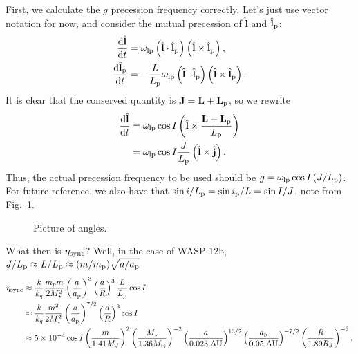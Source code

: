 \documentclass[11pt,
        usenames, %
        dvipsnames %
    ]{article}
\newcommand*{\scinot}[2]{#1\times10^{#2}}
\newcommand*{\rd}[2]{\frac{\mathrm{d}#1}{\mathrm{d}#2}}
\newcommand*{\bm}[1]{\boldsymbol{\mathbf{#1}}}
\newcommand*{\p}[1]{\left(#1\right)}
\newcommand*{\uv}[1]{\hat{\bm{#1}}}
\begin{document}
First, we calculate the $g$ precession frequency correctly. Let's just use
vector notation for now, and consider the mutual precession of $\uv{l}$ and
$\uv{l}_{\rm p}$:
\begin{align}
    \rd{\uv{l}}{t} &= \omega_{\rm lp}\p{\uv{l} \cdot \uv{l}_{\rm p}}
        \p{\uv{l} \times \uv{l}_{\rm p}},\\
    \rd{\uv{l}_{\rm p}}{t} &= -\frac{L}{L_{\rm p}}\omega_{\rm lp}\p{\uv{l} \cdot
        \uv{l}_{\rm p}} \p{\uv{l} \times \uv{l}_{\rm p}}.
\end{align}
It is clear that the conserved quantity is $\bm{J} = \bm{L} + \bm{L}_{\rm p}$,
so we rewrite
\begin{align}
    \rd{\uv{l}}{t} &= \omega_{\rm lp} \cos I\p{\uv{l} \times
            \frac{\bm{L} + \bm{L}_{\rm p}}{L_{\rm p}}}\nonumber\\
        &= \omega_{\rm lp} \cos I
            \frac{J}{L_{\rm p}}\p{\uv{l} \times \uv{j}}.
\end{align}
Thus, the actual precession frequency to be used should be $g = \omega_{\rm lp}
\cos I \p{J / L_{\rm p}}$. For future reference, we also have that $\sin i /
L_{\rm p} = \sin i_{\rm p} / L = \sin I / J$, note from Fig.~\ref{fig:angles}.
\begin{figure}
    \centering
    \caption{Picture of angles.}\label{fig:angles}
\end{figure}

What then is $\eta_{\rm sync}$? Well, in the case of WASP-12b, $J / L_{\rm p}
\approx L / L_{\rm p} \approx (m/m_{\rm p})\sqrt{a / a_{\rm p}}$
\begin{align}
    \eta_{\rm sync} &\approx
            \frac{k}{k_q}\frac{m_pm}{2M_\star^2}\p{\frac{a}{a_{\rm p}}}^3
            \p{\frac{a}{R}}^3\frac{L}{L_{\rm p}}\cos I\nonumber\\
        &\approx
            \frac{k}{k_q}\frac{m^2}{2M_\star^2}\p{\frac{a}{a_{\rm p}}}^{7/2}
            \p{\frac{a}{R}}^3\cos I\nonumber\\
        &\approx
            \scinot{5}{-4} \cos I\p{\frac{m}{1.41M_J}}^2
                \p{\frac{M_\star}{1.36M_{\odot}}}^{-2}
                \p{\frac{a}{0.023\;\mathrm{AU}}}^{13/2}
                \p{\frac{a_{\rm p}}{0.05\;\mathrm{AU}}}^{-7/2}
                \p{\frac{R}{1.89R_{J}}}^{-3}.
\end{align}
\end{document}
